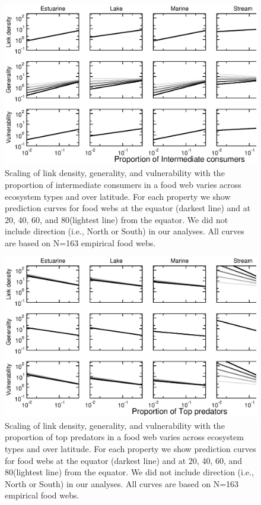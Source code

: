 \documentclass[12pt]{article}
\begin{document}
\newpage


\begin{figure}[h]
\includegraphics[width=.9\textwidth]{Figures/by_TL/scaling_with_S/proportions/I_latlines_nonts.eps}
\caption{Scaling of link density, generality, and vulnerability 
with the proportion of intermediate consumers in a food web
varies across ecosystem types and over latitude. For each property we show 
prediction curves for food webs at the equator (darkest line) and at 
20\degree, 40\degree, 60\degree, and 80\degree (lightest line) from the 
equator. We did not include direction (i.e., North or South) in our analyses. 
All curves are based on N=163 empirical food webs.}
\label{I}
\end{figure}


\begin{figure}[h]
\includegraphics[width=.9\textwidth]{Figures/by_TL/scaling_with_S/proportions/T_latlines_nonts.eps}
\caption{Scaling of link density, generality, and vulnerability 
with the proportion of top predators in a food web
varies across ecosystem types and over latitude. For each property we show 
prediction curves for food webs at the equator (darkest line) and at 
20\degree, 40\degree, 60\degree, and 80\degree (lightest line) from the 
equator. We did not include direction (i.e., North or South) in our analyses. 
All curves are based on N=163 empirical food webs.}
\label{T}
\end{figure}
\end{document}

